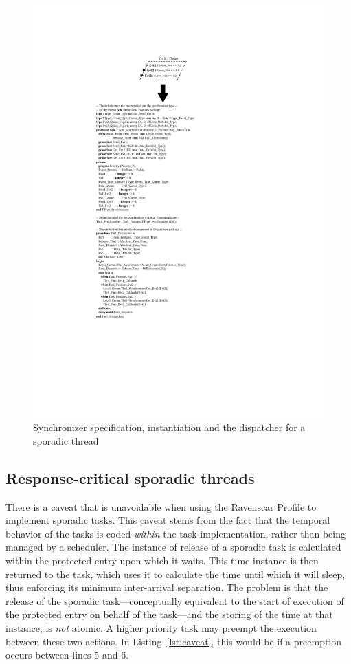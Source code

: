 \begin{figure}
\centering
\includegraphics{figs/eventports}
\caption{Synchronizer specification, instantiation and the dispatcher
  for a sporadic thread}
\label{fig:dispatcher}
\end{figure}
\clearpage

\subsection{Response-critical sporadic threads}
\label{sec:response_crit_st}
There is a caveat that is unavoidable when using the Ravenscar Profile
to implement sporadic tasks. This caveat stems from the fact that the
temporal behavior of the tasks is coded \emph{within} the task
implementation, rather than being managed by a scheduler. The instance
of release of a sporadic task is calculated within the protected entry
upon which it waits. This time instance is then returned to the task,
which uses it to calculate the time until which it will sleep, thus
enforcing its minimum inter-arrival separation. The problem is that
the release of the sporadic task---conceptually equivalent to the
start of execution of the protected entry on behalf of the task---and
the storing of the time at that instance, is \emph{not} atomic. A
higher priority task may preempt the execution between these two
actions. In Listing~\ref{lst:caveat}, this would be if a preemption
occurs between lines 5 and 6.

